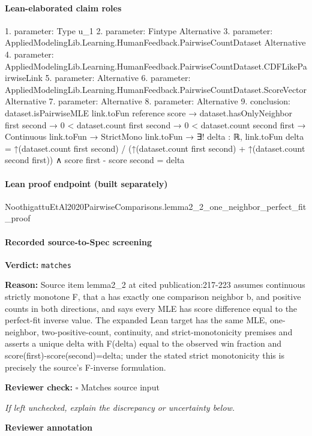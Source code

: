 \documentclass[10pt]{article}
\newcommand{\reviewerbox}{%
  \par\noindent\fbox{\parbox{0.96\linewidth}{\rule{0pt}{0.38in}}}\par
}
\newcommand{\reviewmatch}[1]{%
  \par\noindent\textbf{Reviewer check:} $\square$\; #1\par
  \noindent\emph{If left unchecked, explain the discrepancy or uncertainty below.}\par
}
\begin{document}
\paragraph{Lean-elaborated claim roles}\begin{ReviewVerbatim}
1. parameter: Type u_1
2. parameter: Fintype Alternative
3. parameter: AppliedModelingLib.Learning.HumanFeedback.PairwiseCountDataset Alternative
4. parameter: AppliedModelingLib.Learning.HumanFeedback.PairwiseCountDataset.CDFLikePairwiseLink
5. parameter: Alternative
6. parameter: AppliedModelingLib.Learning.HumanFeedback.PairwiseCountDataset.ScoreVector Alternative
7. parameter: Alternative
8. parameter: Alternative
9. conclusion: dataset.isPairwiseMLE link.toFun reference score →
  dataset.hasOnlyNeighbor first second →
    0 < dataset.count first second →
      0 < dataset.count second first →
        Continuous link.toFun →
          StrictMono link.toFun →
            ∃! delta : ℝ,
              link.toFun delta =
                  ↑(dataset.count first second) / (↑(dataset.count first second) + ↑(dataset.count second first)) ∧
                score first - score second = delta
\end{ReviewVerbatim}

\paragraph{Lean proof endpoint (built separately)}\begin{ReviewVerbatim}
NoothigattuEtAl2020PairwiseComparisons.lemma2_2_one_neighbor_perfect_fit_proof
\end{ReviewVerbatim}

\paragraph{Recorded source-to-Spec screening}
\textbf{Verdict:} \texttt{matches}
\\
{\raggedright
\textbf{Reason:} Source item lemma2\_\allowbreak{}2 at cited publication:\allowbreak{}217-\allowbreak{}223 assumes continuous strictly monotone F, that a has exactly one comparison neighbor b, and positive counts in both directions, and says every MLE has score difference equal to the perfect-\allowbreak{}fit inverse value.\allowbreak{} The expanded Lean target has the same MLE, one-\allowbreak{}neighbor, two-\allowbreak{}positive-\allowbreak{}count, continuity, and strict-\allowbreak{}monotonicity premises and asserts a unique delta with F(delta) equal to the observed win fraction and score(first)-\allowbreak{}score(second)=delta;\allowbreak{} under the stated strict monotonicity this is precisely the source's F-\allowbreak{}inverse formulation.\allowbreak{}
\par}
\reviewmatch{Matches source input}
\noindent\textbf{Reviewer annotation}\par
\reviewerbox
\clearpage
\hypertarget{source-claim-f4e00b752a4932aa}{}
\end{document}

